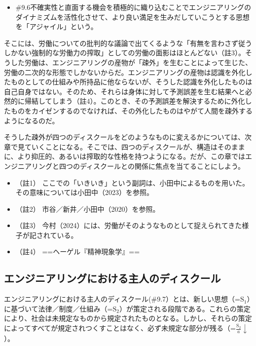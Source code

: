 \begin{note}{}
  \begin{itemize}
    \tightlist
    \item{\#9.6}不確実性と直面する機会を積極的に織り込むことでエンジニアリングのダイナミズムを活性化させて、より良い満足を生みだしていこうとする思想を「アジャイル」という。
  \end{itemize}
\end{note}

そこには、労働についての批判的な議論で出てくるような「有無を言わさず従うしかない強制的な労働力の搾取」としての労働の面影はほとんどない（註3）。そうした労働は、エンジニアリングの産物が「疎外」を生むことによって生じた、労働の二次的な形態でしかないからだ。エンジニアリングの産物は認識を外化したものとしての仕組みや所持品に他ならないが、そうした認識を外化したものは自己自身ではない。そのため、それらは身体に対して予測誤差を生む結果へと必然的に帰結してしまう（註4）。このとき、その予測誤差を解決するために外化したものをカイゼンするのでなければ、その外化したものはやがて人間を疎外するようになるのだ。

そうした疎外が四つのディスクールをどのようなものに変えるかについては、次章で見ていくことになる。そこでは、四つのディスクールが、構造はそのままに、より抑圧的、あるいは搾取的な性格を持つようになる。だが、この章ではエンジニアリングと四つのディスクールとの関係に焦点を当てることにしよう。

\begin{itemize}
\tightlist
\item
  （註1）
  ここでの「いきいき」という副詞は、小田中によるものを用いた。その意味については小田中（2023）\cite{Odanaka}を参照。
\item
  （註2） 市谷／新井／小田中（2020）\cite{IchitaniEtAl}を参照。
\item
  （註3）
  今村（2024）\cite{Imamura}には、労働がそのようなものとして捉えられてきた様子が記されている。
\item
  （註4） ==ヘーゲル『精神現象学』==
\end{itemize}

\subsection{エンジニアリングにおける主人のディスクール}\label{ux30a8ux30f3ux30b8ux30cbux30a2ux30eaux30f3ux30b0ux306bux304aux3051ux308bux4e3bux4ebaux306eux30c7ux30a3ux30b9ux30afux30fcux30eb}

エンジニアリングにおける主人のディスクール(\#9.7）とは、新しい思想（=\(\textrm{S}_1\)）に基づいて法律／制度／仕組み（=\(\textrm{S}_2\)）が策定される段階である。これらの策定により、社会は未規定なものから規定されたものとなる。しかし、それらの策定によってすべてが規定されつくすことはなく、必ず未規定な部分が残る（=\(\frac{\textrm{S}_2}{a}\downarrow\)）。

